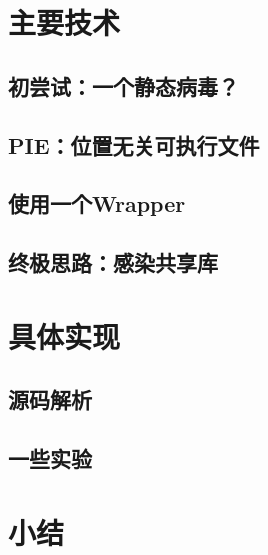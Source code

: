 \documentclass[11pt]{article}
\begin{document}
	
\section{主要技术}
\subsection{初尝试：一个静态病毒？}
\subsection{PIE：位置无关可执行文件}
\subsection{使用一个Wrapper}
\subsection{终极思路：感染共享库}
\section{具体实现}
\subsection{源码解析}
\subsection{一些实验}
\section{小结}
\end{document}

